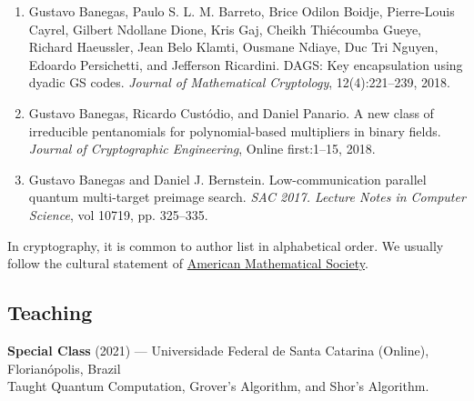 \begin{enumerate}
\item Gustavo Banegas, Paulo S. L. M. Barreto, Brice Odilon Boidje, Pierre-Louis Cayrel, Gilbert Ndollane Dione, Kris Gaj, Cheikh Thiécoumba Gueye, Richard Haeussler, Jean Belo Klamti, Ousmane Ndiaye, Duc Tri Nguyen, Edoardo Persichetti, and Jefferson Ricardini. DAGS: Key encapsulation using dyadic GS codes. \textit{Journal of Mathematical Cryptology}, 12(4):221–239, 2018.
\item Gustavo Banegas, Ricardo Custódio, and Daniel Panario. A new class of irreducible pentanomials for polynomial-based multipliers in binary fields. \textit{Journal of Cryptographic Engineering}, Online first:1–15, 2018.
\item Gustavo Banegas and Daniel J. Bernstein. Low-communication parallel quantum multi-target preimage search. \textit{SAC 2017. Lecture Notes in Computer Science}, vol 10719, pp. 325–335.
\end{enumerate}
In cryptography, it is common to author list in alphabetical order. We usually follow the cultural statement of \href{https://www.ams.org/profession/leaders/CultureStatement04.pdf}{American Mathematical Society}. 

\subsection*{Teaching}
\noindent
\textbf{Special Class} (2021) — Universidade Federal de Santa Catarina (Online), Florianópolis, Brazil~\\
Taught Quantum Computation, Grover's Algorithm, and Shor's Algorithm. ~\\

